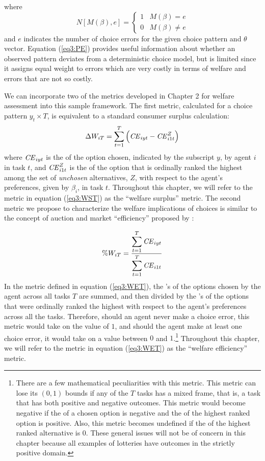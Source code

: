 \documentclass[../main.tex]{subfiles}
\begin{document}
\noindent where
\begin{equation}
	\label{eq3:NMB}
	N[M(\beta), e] =
	\begin{cases}
		1 & M(\beta) = e\\
		0 & M(\beta) \neq e
	\end{cases}
\end{equation}
\noindent and $e$ indicates the number of choice errors for the given choice pattern and $\theta$ vector.
Equation (\ref{eq3:PE}) provides useful information about whether an observed pattern deviates from a deterministic choice model, but is limited since it assigns equal weight to errors which are very costly in terms of welfare and errors that are not so costly.

We can incorporate two of the metrics developed in Chapter 2 for welfare assessment into this sample framework.
The first metric, calculated for a choice pattern $y_t \times T$, is equivalent to a standard consumer surplus calculation:
\begin{equation}
	\label{eq3:WST}
	\Delta W_{iT} = \sum_{t=1}^T \left( {\mathit{CE}}_{iyt} - {\mathit{CE}}_{i1t}^Z \right)
\end{equation}
\noindent where ${\mathit{CE}}_{iyt}$ is the {\CE} of the option chosen, indicated by the subscript $y$, by agent $i$ in task $t$, and ${\mathit{CE}}_{i1t}^Z$ is the {\CE} of the option that is ordinally ranked the highest among the set of \textit{unchosen} alternatives, $Z$, with respect to the agent's preferences, given by $\beta_i$, in task $t$.
Throughout this chapter, we will refer to the metric in equation (\ref{eq3:WST}) as the \enquote{welfare surplus} metric.
The second metric we propose to characterize the welfare implications of choices is similar to the concept of auction and market \enquote{efficiency} proposed by \textcite{Plott1978}:

\begin{equation}
	\label{eq3:WET}
	\%W_{iT} = \frac{\displaystyle\sum_{t=1}^{T} {\mathit{CE}}_{iyt} }{\displaystyle\sum_{t=1}^{T} {\mathit{CE}}_{i1t}}
\end{equation}
\noindent In the metric defined in equation (\ref{eq3:WET}), the {\CE}'s of the options chosen by the agent across all tasks $T$ are summed, and then divided by the {\CE}'s of the options that were ordinally ranked the highest with respect to the agent's preferences across all the tasks.
Therefore, should an agent never make a choice error, this metric would take on the value of $1$, and should the agent make at least one choice error, it would take on a value between $0$ and $1$.\footnote{
	There are a few mathematical peculiarities with this metric.
	This metric can lose its $(0,1)$ bounds if any of the $T$ tasks has a mixed frame, that is, a task that has both positive and negative outcomes.
	This metric would become negative if the {\CE} of a chosen option is negative and the {\CE} of the highest ranked option is positive.
	Also, this metric becomes undefined if the {\CE} of the highest ranked alternative is $0$.
	These general issues will not be of concern in this chapter because all examples of lotteries have outcomes in the strictly positive domain.
}
Throughout this chapter, we will refer to the metric in equation (\ref{eq3:WET}) as the \enquote{welfare efficiency} metric.
\end{document}

